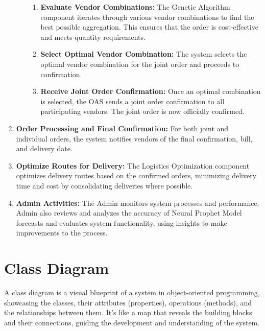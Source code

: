 \begin{enumerate}
\begin{itemize}
\begin{enumerate}
                        \item \textbf{Evaluate Vendor Combinations:} The Genetic Algorithm component iterates through various vendor combinations to find the best possible aggregation. This ensures that the order is cost-effective and meets quantity requirements.
                        \item \textbf{Select Optimal Vendor Combination:} The system selects the optimal vendor combination for the joint order and proceeds to confirmation.
                        \item \textbf{Receive Joint Order Confirmation:} Once an optimal combination is selected, the OAS sends a joint order confirmation to all participating vendors. The joint order is now officially confirmed.
                    \end{enumerate}
          \end{itemize}
    \item \textbf{Order Processing and Final Confirmation:} For both joint and individual orders, the system notifies vendors of the final confirmation, bill, and delivery date.
    \item \textbf{Optimize Routes for Delivery:} The Logistics Optimization component optimizes delivery routes based on the confirmed orders, minimizing delivery time and cost by consolidating deliveries where possible.
    \item \textbf{Admin Activities:} The Admin monitors system processes and performance. Admin also reviews and analyzes the accuracy of Neural Prophet Model forecasts and evaluates system functionality, using insights to make improvements to the process.
\end{enumerate}
\section{Class Diagram}

A class diagram is a visual blueprint of a system in object-oriented programming, showcasing the classes, their attributes (properties), operations (methods), and the relationships between them. It’s like a map that reveals the building blocks and their connections, guiding the development and understanding of the system.

